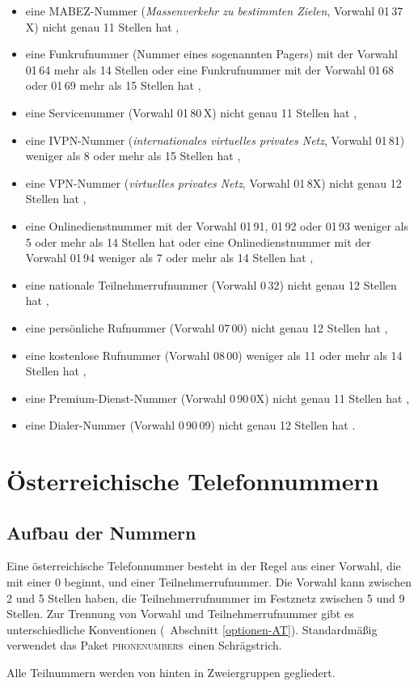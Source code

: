 \documentclass[numbers=noenddot]{scrreprt}
\newcommand\Abschnittsliteratur[1]{\bgroup
\small
\raggedright
\printbibliography[heading=subbibnumbered,keyword=#1]
\egroup}
\newcommand*\Paket[1]{\textsc{#1}}
\newcommand\phone{\textcolor{cnltx}{\Paket{phone\-numbers}}}
\newcommand\UeberschriftAufbau{\section{Aufbau der Nummern}}
\newcommand*\vglAbschnitt[1]{(\cf\ Abschnitt \ref{#1})}
\newcommand*\AufbauDEATA[6]{Eine #1 Telefonnummer besteht in der Regel aus einer Vorwahl, die mit einer 0 beginnt, und einer Teilnehmerrufnummer. Die Vorwahl kann zwischen #2 und #3 Stellen haben, die Teilnehmerrufnummer im Festznetz zwischen #4 und #5 Stellen. Zur Trennung von Vorwahl und Teilnehmerrufnummer gibt es unterschiedliche Konventionen
\vglAbschnitt{#6}.
Standardmäßig verwendet das Paket \phone\ einen Schrägstrich.}
\begin{document}
\begin{itemize}
\item eine MABEZ-Nummer (\emph{Massenverkehr zu bestimmten Zielen}, Vorwahl 01\,37\,X) nicht genau 11 Stellen hat \cite[2]{BNA-mabez},
\item eine Funkrufnummer (Nummer eines sogenannten Pagers) mit der Vorwahl 01\,64 mehr als 14 Stellen oder eine Funkrufnummer mit der Vorwahl 01\,68 oder 01\,69 mehr als 15 Stellen hat \cite[2]{BNA-nummernplan},
\item eine Servicenummer (Vorwahl 01\,80\,X) nicht genau 11 Stellen hat \cite[71]{BNA-konzept},
\item eine IVPN-Nummer (\emph{internationales virtuelles privates Netz}, Vorwahl 01\,81) weniger als 8 oder mehr als 15 Stellen hat \cite[55]{BNA-konzept},
\item eine VPN-Nummer (\emph{virtuelles privates Netz}, Vorwahl 01\,8X) nicht genau 12 Stellen hat \cite[53]{BNA-konzept},
\item eine Onlinedienstnummer mit der Vorwahl 01\,91, 01\,92 oder 01\,93 weniger als 5 oder mehr als 14 Stellen hat oder eine Onlinedienstnummer mit der Vorwahl 01\,94 weniger als 7 oder mehr als 14 Stellen hat \cite[\ppno\ 1 u. 4]{BNA-019},
\item eine nationale Teilnehmerrufnummer (Vorwahl 0\,32) nicht genau 12 Stellen hat \cite[45]{BNA-konzept},
\item eine persönliche Rufnummer (Vorwahl 07\,00) nicht genau 12 Stellen hat \cite[74]{BNA-konzept},
\item eine kostenlose Rufnummer (Vorwahl 08\,00) weniger als 11 oder mehr als 14 Stellen hat \cite[\ppno\ 1 u. 5\psq]{BNA-0800},
\item eine Premium-Dienst-Nummer (Vorwahl 0\,90\,0X) nicht genau 11 Stellen hat \cite[76]{BNA-konzept},
\item eine Dialer-Nummer (Vorwahl 0\,90\,09) nicht genau 12 Stellen hat \cite[78]{BNA-konzept}.
\end{itemize}

\Abschnittsliteratur{german}

\chapter{Österreichische Telefonnummern}
\UeberschriftAufbau
\AufbauDEATA{österreichische}{2}{5}{5}{9}{optionen-AT}

Alle Teilnummern werden von hinten in Zweiergruppen gegliedert.
\begin{sidebyside}
\end{sidebyside}
\end{document}
